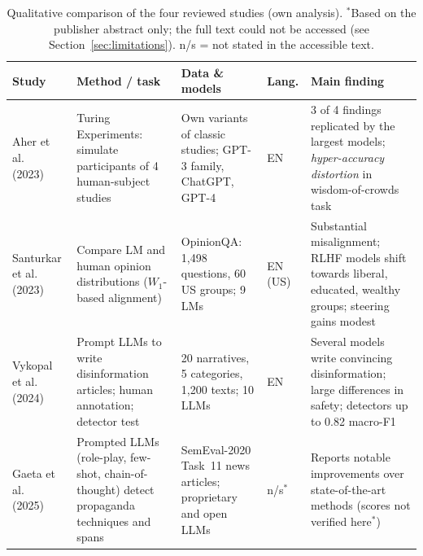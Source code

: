 \begin{table}[t]
\centering
\footnotesize
\renewcommand{\arraystretch}{1.15}
\begin{tabular}{@{}p{1.9cm}p{3.0cm}p{2.7cm}p{1.0cm}p{4.9cm}@{}}
\toprule
\textbf{Study} & \textbf{Method / task} & \textbf{Data \& models} & \textbf{Lang.} & \textbf{Main finding} \\
\midrule
Aher et al.~\cite{aher2023using} (2023) & Turing Experiments: simulate participants of 4 human-subject studies & Own variants of classic studies; GPT-3 family, ChatGPT, GPT-4 & EN & 3 of 4 findings replicated by the largest models; \emph{hyper-accuracy distortion} in wisdom-of-crowds task \\
\addlinespace
Santurkar et al.~\cite{santurkar2023whose} (2023) & Compare LM and human opinion distributions ($W_1$-based alignment) & OpinionQA: 1,498 questions, 60 US groups; 9 LMs & EN (US) & Substantial misalignment; RLHF models shift towards liberal, educated, wealthy groups; steering gains modest \\
\addlinespace
Vykopal et al.~\cite{vykopal2024disinformation} (2024) & Prompt LLMs to write disinformation articles; human annotation; detector test & 20 narratives, 5 categories, 1,200 texts; 10 LLMs & EN & Several models write convincing disinformation; large differences in safety; detectors up to 0.82 macro-F1 \\
\addlinespace
Gaeta et al.~\cite{gaeta2025towards} (2025) & Prompted LLMs (role-play, few-shot, chain-of-thought) detect propaganda techniques and spans & SemEval-2020 Task~11 news articles; proprietary and open LLMs & n/s$^{*}$ & Reports notable improvements over state-of-the-art methods (scores not verified here$^{*}$) \\
\bottomrule
\end{tabular}
\caption{Qualitative comparison of the four reviewed studies (own analysis). $^{*}$Based on the publisher abstract only; the full text could not be accessed (see Section~\ref{sec:limitations}). n/s = not stated in the accessible text.}
\label{tab:comparison}
\end{table}
